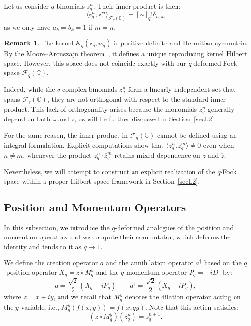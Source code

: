 \documentclass[10pt]{amsart}
\theoremstyle{plain}
\theoremstyle{definition}
\newtheorem{remark}[theorem]{Remark}
\renewcommand{\bar}[1]{\overline{#1}}
\begin{document}
Let us consider $q$-binomials $z_q^n$. Their inner product is then:
$$
\langle z_q^n,z_q^m\rangle_{\mathcal{F}_q(\mathbb{C})} = [n]_q!\delta_{n,m}
$$
as we only have $a_k = b_k = 1$ if $m=n$.


\begin{remark}
The kernel $ K_q(z_{q}, w_{q}) $ is positive definite and Hermitian symmetric. By the Moore--Aronszajn theorem~\cite{Moore-Aronszajn}, it defines a unique reproducing kernel Hilbert space. However, this space does not coincide exactly with our $q$-deformed Fock space $ \mathcal{F}_q(\mathbb{C}) $.

Indeed, while the $q$-complex binomials $ z_q^n $ form a linearly independent set that spans $ \mathcal{F}_q(\mathbb{C}) $, they are not orthogonal with respect to the standard inner product. This lack of orthogonality arises because the monomials $ z_q^n $ generally depend on both $ z $ and $ \bar{z} $, as will be further discussed in Section~\ref{secL2}.

For the same reason, the inner product in $ \mathcal{F}_q(\mathbb{C}) $ cannot be defined using an integral formulation. Explicit computations show that $ \langle z_q^n, z_q^m \rangle \neq 0 $ even when $ n \neq m $, whenever the product $ z_q^n \cdot \bar{z}_q^m $ retains mixed dependence on $ z $ and $ \bar{z} $.

Nevertheless, we will attempt to construct an explicit realization of the $q$-Fock space within a proper Hilbert space framework in Section~\ref{secL2}.
\end{remark}




\subsection{Position and Momentum Operators}

In this subsection, we introduce the $q$-deformed analogues of the position and momentum operators and
we compute their commutator, which deforms the identity and tends to it as 
$q\to1$.


We define the creation operator $ a $ and the annihilation operator $ a^{\dagger} $  based on the $q$-position operator $X_q = z \circ M_q^y$  and the $q$-momentum operator $P_q = - iD_z $  by:
\[
a  = \frac{\sqrt{2}}{2} (X_q+iP_q)  \qquad a^{\dagger} = \frac{\sqrt{2}}{2} (X_q - iP_q) ,
\]
where $ z = x + i y $, and we recall that $ M_q^y $ denotes the dilation operator acting on the $ y $-variable, i.e., $ M_q^y(f(x,y)) = f(x, qy) $.
Note that this action satisfies:
\[
(z \circ M_q^y)(z_q^n) = z_q^{n+1}.
\]
\end{document}

